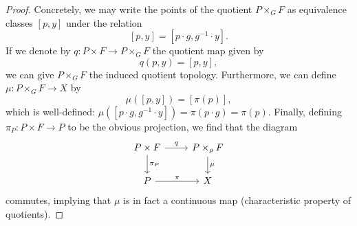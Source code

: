 \documentclass{book}
\theoremstyle{plain}
\theoremstyle{definition}
\theoremstyle{remark}
\begin{document}
\begin{proof}
    Concretely, we may write the points of the quotient $P\times_G F$ as equivalence classes $[p,y]$ under the relation
    \[[p,y]=[p\cdot g,g^{-1}\cdot y].\]
    If we denote by $q:P\times F\to P\times_G F$ the quotient map given by
    \[q(p,y)=[p,y],\]
    we can give $P\times_G F$ the induced quotient topology. Furthermore, we can define $\mu:P\times_G F\to X$ by
    \[\mu([p,y])=[\pi(p)],\]
    which is well-defined: $\mu([p\cdot g,g^{-1}\cdot y])=\pi(p\cdot g)=\pi(p)$. Finally, defining
    $\pi_P:P\times F\to P$ to be the obvious projection, we find that the diagram
    \begin{equation*}
        \begin{tikzcd}
            P\times F\arrow{r}{q}\arrow{d}{\pi_P}&P\times_\rho F\arrow{d}{\mu}\\
            P\arrow{r}{\pi}&X
        \end{tikzcd}
    \end{equation*}
    commutes, implying that $\mu$ is in fact a continuous map (characteristic property of quotients).
    

\end{proof}
\end{document}
